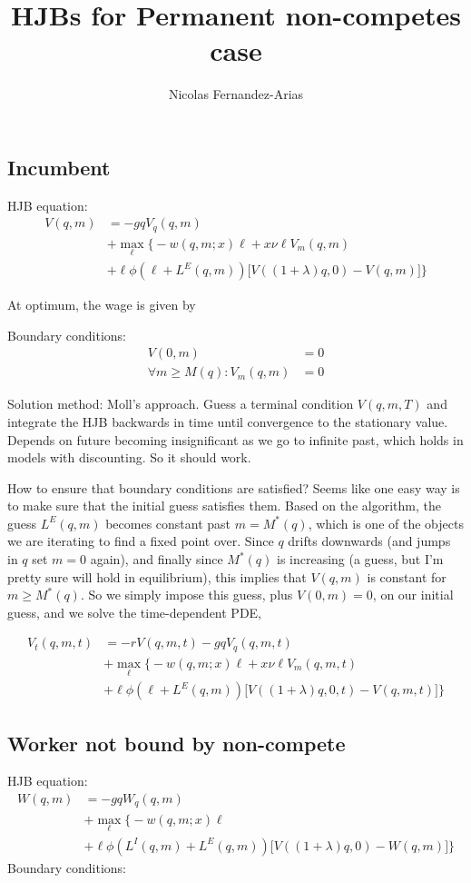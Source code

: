 \documentclass[12pt,english]{article}
\theoremstyle{remark}
\begin{document}
\title{HJBs for Permanent non-competes case}
\author{Nicolas Fernandez-Arias}
\maketitle

\subsection*{Incumbent}
HJB equation: 
\begin{align*}
V(q,m) &= -gqV_q(q,m) \\
	   &+ \max_{\ell} \big\{ -w(q,m;x) \ell + x\nu \ell V_m (q,m)  \\ 
	   &+ \ell \phi (\ell + L^E(q,m))\big[V((1+\lambda)q,0)-V(q,m)\big] \big\} 
\end{align*}

At optimum, the wage is given by 

Boundary conditions: 
\begin{align*}
V(0,m) &= 0 \\
\forall m \ge M(q): V_m(q,m) &= 0
\end{align*}

Solution method: Moll's approach. Guess a terminal condition $V(q,m,T)$ and integrate the HJB backwards in time until convergence to the stationary value. Depends on future becoming insignificant as we go to infinite past, which holds in models with discounting. So it should work. 

How to ensure that boundary conditions are satisfied? Seems like one easy way is to make sure that the initial guess satisfies them. Based on the algorithm, the guess $L^E(q,m)$ becomes constant past $m = M^* (q)$, which is one of the objects we are iterating to find a fixed point over. Since $q$ drifts downwards (and jumps in $q$ set $m = 0$ again), and finally since $M^*(q)$ is increasing (a guess, but I'm pretty sure will hold in equilibrium), this implies that $V(q,m)$ is constant for $m \ge M^*(q)$. So we simply impose this guess, plus $V(0,m) = 0$, on our initial guess, and we solve the time-dependent PDE, 

\begin{align*}
V_t(q,m,t) &= - rV(q,m,t) - gqV_q(q,m,t) \\
					&+ \max_{\ell} \big\{  -w(q,m;x)\ell + x\nu \ell V_m (q,m,t) \\
					&+ \ell \phi (\ell + L^E(q,m)) \big[ V((1+\lambda)q,0,t)- V(q,m,t)  \big] \big\}
\end{align*}


\subsection*{Worker not bound by non-compete}
HJB equation:
\begin{align*}
W(q,m) &= -gqW_q(q,m) \\
	   &+ \max_{\ell} \big\{-w(q,m;x)\ell \\
	   &+ \ell \phi (L^I(q,m) + L^E(q,m)) \big[ V((1+\lambda)q,0)-W(q,m) \big]\big\}
\end{align*}
Boundary conditions: 
\end{document}
